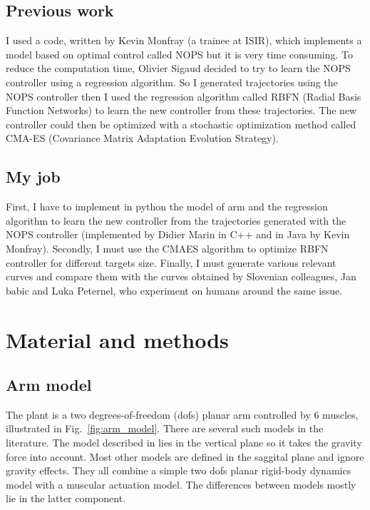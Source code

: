 \documentclass[pdftex,a4paper,11pt]{report}
\begin{document}
\section{Previous work}
I used a code, written by Kevin Monfray (a trainee at ISIR), which implements a model based on optimal control called NOPS but it is very time consuming.
To reduce the computation time, Olivier Sigaud decided to try to learn the NOPS controller using a regression algorithm.
So I generated trajectories using the NOPS controller then I used the regression algorithm called RBFN (Radial Basis Function Networks) to learn the new controller from these trajectories.
The new controller could then be optimized with a stochastic optimization method called CMA-ES (Covariance Matrix Adaptation Evolution Strategy).

\section{My job}
First, I have to implement in python the model of arm and the regression algorithm to learn the new controller from the trajectories generated with the NOPS controller (implemented by Didier Marin in C++ and in Java by Kevin Monfray).
Secondly, I must use the CMAES algorithm to optimize RBFN controller for different targets size.
Finally, I must generate various relevant curves and compare them with the curves obtained by Slovenian colleagues, Jan babic and Luka Peternel, who experiment on humans around the same issue.

\chapter{Material and methods}

\section{Arm model}
\label{sec_ArmModel}

The plant is a two degrees-of-freedom (dofs) planar arm controlled by 6 muscles, illustrated in Fig.~\ref{fig:arm_model}.
There are several such models in the literature. The model described in \cite{Kambara2009} lies in the vertical
plane so it takes the gravity force into account. Most other models are defined in the saggital plane and
ignore gravity effects. They all combine a simple two dofs planar rigid-body dynamics model with a 
muscular actuation model. The differences between models mostly lie in the latter component.
\end{document}
